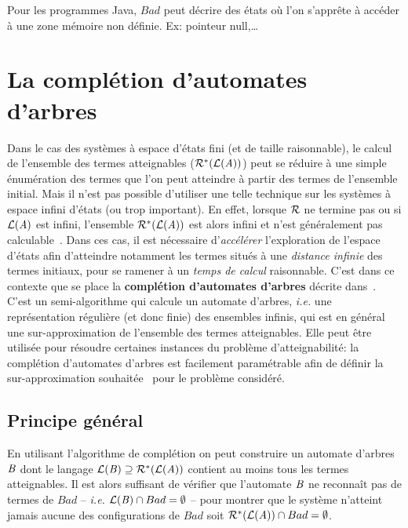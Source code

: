 Pour les programmes Java, $Bad$ peut décrire des états où l'on
s'apprête à accéder à une zone mémoire non définie. Ex: pointeur null,\dots

\section{La complétion d'automates d'arbres}
\label{sec:completion}
Dans le cas des systèmes à espace d'états fini (et de taille
raisonnable), le calcul de l'ensemble des termes atteignables
($\mathcal R^*(\mathcal{L}(\mathit A))$) peut se réduire à une simple énumération des
termes que l'on peut atteindre à partir des termes de l'ensemble
initial.  Mais il n'est pas possible d'utiliser une telle
technique sur les systèmes à espace infini d'états (ou trop
important). En effet, lorsque $\mathcal R$ ne termine pas ou si 
$\mathcal{L}(\mathit A)$ est infini, l'ensemble $\mathcal R^*(\mathcal{L}(\mathit A))$ est
alors infini et n'est généralement pas calculable~\cite{GilleronTison-FI95}.
Dans ces cas, il est nécessaire d'\textit{accélérer} l'exploration de
l'espace d'états afin d'atteindre notamment les termes situés à une
\textit{distance infinie} des termes initiaux, pour se ramener à un 
\textit{temps de calcul} raisonnable.
C'est dans ce contexte que se place la \textbf{complétion d'automates d'arbres}
décrite dans~\cite{Genet-RTA98,FeuilladeGVTT-JAR04}.
C'est un semi-algorithme qui calcule un automate d'arbres, \textit{i.e.} une représentation
régulière (et donc finie) des ensembles infinis, qui est en général
une sur-approximation de l'ensemble des termes atteignables.
Elle peut être utilisée pour résoudre certaines instances du problème d'atteignabilité:
la complétion d'automates d'arbres est facilement paramétrable afin de définir 
la sur-approximation souhaitée~\cite{Genet-RTA98,FeuilladeGVTT-JAR04,Takai-RTA04}
pour le problème considéré.

\subsection{Principe général}

En utilisant l'algorithme de complétion on peut construire un
automate d'arbres $\mathit B$ dont le langage $\mathcal{L}(\mathit B) \supseteq
\mathcal R^*(\mathcal{L}(\mathit A))$ contient au moins tous les termes atteignables.  Il
est alors suffisant de vérifier que l'automate $\mathit B$ ne reconnaît pas
de termes de $Bad$ -- \textit{i.e.} $\mathcal{L}(\mathit B)\cap Bad = \emptyset$ --
pour montrer que le système n'atteint jamais aucune des configurations
de $Bad$ soit $\mathcal R^*(\mathcal{L}(\mathit A))\cap Bad=\emptyset$.


